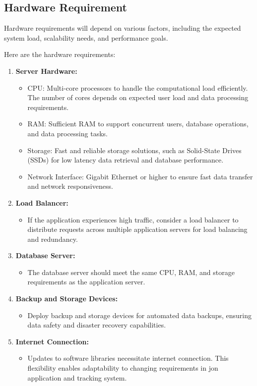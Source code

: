 \subsection{Hardware Requirement}
Hardware requirements will depend on various factors, including the expected system load, scalability needs, and performance goals. 

Here are the hardware requirements:

\begin{enumerate}
    \item \textbf{Server Hardware:}
		\begin{itemize}
			\item CPU: Multi-core processors to handle the computational load efficiently. The number of cores depends on expected user load and data processing requirements.
			\item RAM: Sufficient RAM to support concurrent users, database operations, and data processing tasks.
			\item Storage: Fast and reliable storage solutions, such as Solid-State Drives (SSDs) for low latency data retrieval and database performance.
			\item Network Interface: Gigabit Ethernet or higher to ensure fast data transfer and network responsiveness.
		\end{itemize}
    \item \textbf{Load Balancer:}
		\begin{itemize}
			\item If the application experiences high traffic, consider a load balancer to distribute requests across multiple application servers for load balancing and redundancy.
		\end{itemize}
    \item \textbf{Database Server:}
		\begin{itemize}
			\item The database server should meet the same CPU, RAM, and storage requirements as the application server.
		\end{itemize}
    \item \textbf{Backup and Storage Devices:}
		\begin{itemize}
			\item Deploy backup and storage devices for automated data backups, ensuring data safety and disaster recovery capabilities.
		\end{itemize}
    \item \textbf{Internet Connection:}
		\begin{itemize}
			\item Updates to software libraries necessitate internet connection. This flexibility enables adaptability to changing requirements in jon application and tracking system.
		\end{itemize}
\end{enumerate}


